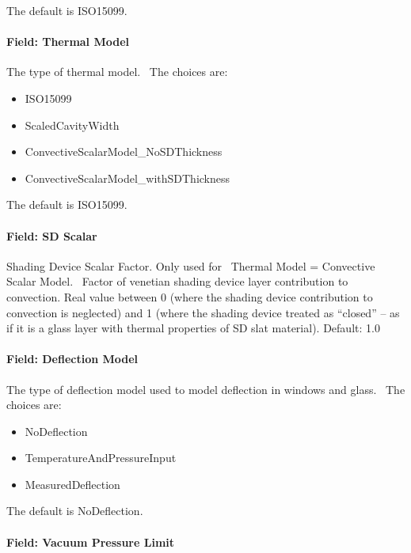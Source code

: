 The default is ISO15099.

\paragraph{Field: Thermal Model}\label{field-thermal-model}

The type of thermal model.~ The choices are:

\begin{itemize}
\item
  ISO15099
\item
  ScaledCavityWidth
\item
  ConvectiveScalarModel\_NoSDThickness
\item
  ConvectiveScalarModel\_withSDThickness
\end{itemize}

The default is ISO15099.

\paragraph{Field: SD Scalar}\label{field-sd-scalar}

Shading Device Scalar Factor. Only used for~ Thermal Model = Convective Scalar Model.~ Factor of venetian shading device layer contribution to convection. Real value between 0 (where the shading device contribution to convection is neglected) and 1 (where the shading device treated as ``closed'' -- as if it is a glass layer with thermal properties of SD slat material). Default: 1.0

\paragraph{Field: Deflection Model}\label{field-deflection-model}

The type of deflection model used to model deflection in windows and glass.~ The choices are:

\begin{itemize}
\item
  NoDeflection
\item
  TemperatureAndPressureInput
\item
  MeasuredDeflection
\end{itemize}

The default is NoDeflection.

\paragraph{Field: Vacuum Pressure Limit}\label{field-vacuum-pressure-limit}

